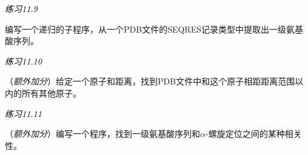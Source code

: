 \textcolor{black}{\textit{练习11.9}}
\begin{adjustwidth}{4em}{}
编写一个递归的子程序，从一个PDB文件的SEQRES记录类型中提取出一级氨基酸序列。
\end{adjustwidth}

\textcolor{black}{\textit{练习11.10}}
\begin{adjustwidth}{4em}{}
（\textit{额外加分}）给定一个原子和距离，找到PDB文件中和这个原子相距距离范围以内的所有其他原子。
\end{adjustwidth}

\textcolor{black}{\textit{练习11.11}}
\begin{adjustwidth}{4em}{}
（\textit{额外加分}）编写一个程序，找到一级氨基酸序列和$\alpha$-螺旋定位之间的某种相关性。
\end{adjustwidth}

